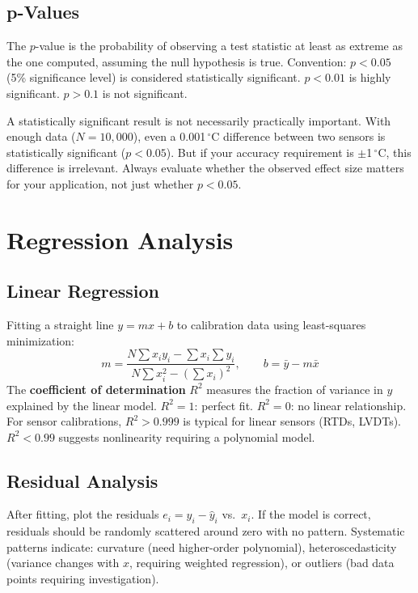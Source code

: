 \documentclass[11pt,letterpaper,twoside,openany]{book}
\newcommand{\degC}{\ensuremath{{}^{\circ}\text{C}}}
\begin{document}
\subsection{p-Values}
The $p$-value is the probability of observing a test statistic at least as extreme as the one computed, assuming the null hypothesis is true. Convention: $p < 0.05$ (5\% significance level) is considered statistically significant. $p < 0.01$ is highly significant. $p > 0.1$ is not significant.

\begin{warningbox}
A statistically significant result is not necessarily practically important. With enough data ($N = 10{,}000$), even a 0.001\,\degC{} difference between two sensors is statistically significant ($p < 0.05$). But if your accuracy requirement is $\pm$1\,\degC{}, this difference is irrelevant. Always evaluate whether the observed effect size matters for your application, not just whether $p < 0.05$.
\end{warningbox}

\section{Regression Analysis}
\subsection{Linear Regression}
Fitting a straight line $y = mx + b$ to calibration data using least-squares minimization:
\begin{equation}
m = \frac{N\sum x_i y_i - \sum x_i \sum y_i}{N\sum x_i^2 - (\sum x_i)^2}, \qquad b = \bar{y} - m\bar{x}
\end{equation}
The \textbf{coefficient of determination} $R^2$ measures the fraction of variance in $y$ explained by the linear model. $R^2 = 1$: perfect fit. $R^2 = 0$: no linear relationship. For sensor calibrations, $R^2 > 0.999$ is typical for linear sensors (RTDs, LVDTs). $R^2 < 0.99$ suggests nonlinearity requiring a polynomial model.

\subsection{Residual Analysis}
After fitting, plot the residuals $e_i = y_i - \hat{y}_i$ vs.\ $x_i$. If the model is correct, residuals should be randomly scattered around zero with no pattern. Systematic patterns indicate: curvature (need higher-order polynomial), heteroscedasticity (variance changes with $x$, requiring weighted regression), or outliers (bad data points requiring investigation).
\end{document}
